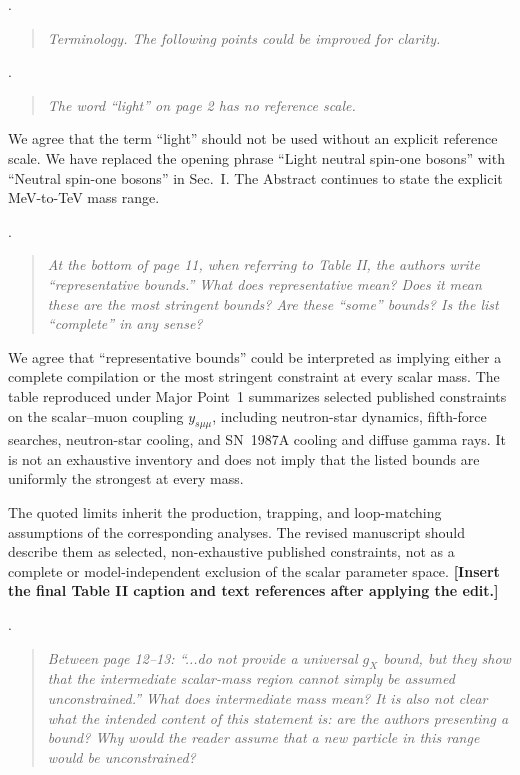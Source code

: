 \documentclass[12pt,a4paper]{article}
\begin{document}
\medskip
{}. \begin{quote}\itshape
Terminology. The following points could be improved for clarity.
\end{quote}

\medskip
{}. \begin{quote}\itshape
The word ``light'' on page 2 has no reference scale.
\end{quote}

We agree that the term ``light'' should not be used without an explicit reference scale. We have replaced the opening phrase ``Light neutral spin-one bosons'' with ``Neutral spin-one bosons'' in Sec.~I. The Abstract continues to state the explicit MeV-to-TeV mass range.

\medskip
{}. \begin{quote}\itshape
At the bottom of page 11, when referring to Table II, the authors write ``representative bounds.'' What does representative mean? Does it mean these are the most stringent bounds? Are these ``some'' bounds? Is the list ``complete'' in any sense?
\end{quote}

We agree that ``representative bounds'' could be interpreted as implying either a complete compilation or the most stringent constraint at every scalar mass. The table reproduced under Major Point~1 summarizes selected published constraints on the scalar--muon coupling \(y_{s\mu\mu}\), including neutron-star dynamics, fifth-force searches, neutron-star cooling, and SN~1987A cooling and diffuse gamma rays. It is not an exhaustive inventory and does not imply that the listed bounds are uniformly the strongest at every mass.

The quoted limits inherit the production, trapping, and loop-matching assumptions of the corresponding analyses. The revised manuscript should describe them as selected, non-exhaustive published constraints, not as a complete or model-independent exclusion of the scalar parameter space. \textbf{[Insert the final Table II caption and text references after applying the edit.]}

\medskip
{}. \begin{quote}\itshape
Between page 12--13: ``...do not provide a universal \(g_X\) bound, but they show that the intermediate scalar-mass region cannot simply be assumed unconstrained.'' What does intermediate mass mean? It is also not clear what the intended content of this statement is: are the authors presenting a bound? Why would the reader assume that a new particle in this range would be unconstrained?
\end{quote}
\end{document}
